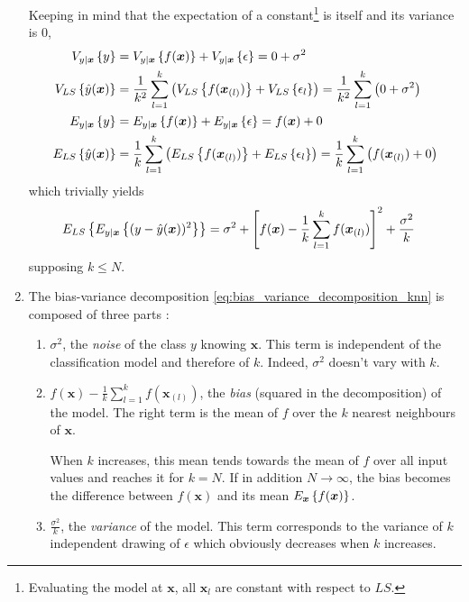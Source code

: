 \documentclass[a4paper, 12pt]{article}
\begin{document}
\begin{enumerate}[label = (\alph*)]
	    Keeping in mind that the expectation of a constant\footnote{Evaluating the model at $\bm{x}$, all $\bm{x}_l$ are constant with respect to $LS$.} is itself and its variance is $0$,
	    \begin{align*}
	        V_{y \mid \bm{x}} \left\{y\right\} & = V_{y \mid \bm{x}} \left\{f(\bm{x})\right\} + V_{y \mid \bm{x}} \left\{\epsilon\right\} = 0 + \sigma^2 \\
	        V_{LS} \left\{\hat{y}(\bm{x})\right\} & = \frac{1}{k^2} \sum_{l = 1}^{k} \left( V_{LS} \left\{f(\bm{x}_{(l)})\right\} + V_{LS} \left\{\epsilon_l\right\}\right) = \frac{1}{k^2} \sum_{l = 1}^{k} \left(0 + \sigma^2\right) \\
	        E_{y \mid \bm{x}} \left\{y\right\} & = E_{y \mid \bm{x}} \left\{f(\bm{x})\right\} + E_{y \mid \bm{x}} \left\{\epsilon\right\} = f(\bm{x}) + 0 \\
	        E_{LS} \left\{\hat{y}(\bm{x})\right\} & = \frac{1}{k} \sum_{l = 1}^{k} \left(E_{LS} \left\{f(\bm{x}_{(l)})\right\} + E_{LS} \left\{\epsilon_l\right\}\right) = \frac{1}{k} \sum_{l = 1}^{k} \left(f(\bm{x}_{(l)}) + 0\right)
	    \end{align*}
	    which trivially yields
	    \begin{align}
	       E_{LS}\left\{E_{y \mid \bm{x}}\left\{(y - \hat{y}(\bm{x}))^2\right\}\right\} & = \sigma^2 + \left[f(\bm{x}) - \frac{1}{k} \sum_{l = 1}^{k} f(\bm{x}_{(l)})\right]^2 + \frac{\sigma^2}{k} \label{eq:bias_variance_decomposition_knn}
	    \end{align}
	    supposing $k \leq N$.
	    \item The bias-variance decomposition \eqref{eq:bias_variance_decomposition_knn} is composed of three parts :
	    \begin{enumerate}[label = \arabic*.]
	        \item $\sigma^2$, the \emph{noise} of the class $y$ knowing $\bm{x}$. This term is independent of the classification model and therefore of $k$. Indeed, $\sigma^2$ doesn't vary with $k$.

	        \item $f(\bm{x}) - \frac{1}{k} \sum_{l = 1}^{k} f(\bm{x}_{(l)})$, the \emph{bias} (squared in the decomposition) of the model. The right term is the mean of $f$ over the $k$ nearest neighbours of $\bm{x}$.
	        
	        When $k$ increases, this mean tends towards the mean of $f$ over all input values and reaches it for $k = N$. If in addition $N \rightarrow \infty$, the bias becomes the difference between $f(\bm{x})$ and its mean $E_{\bm{x}}\left\{f(\bm{x})\right\}$.
	        
	        \item $\frac{\sigma^2}{k}$, the \emph{variance} of the model. This term corresponds to the variance of $k$ independent drawing of $\epsilon$ which obviously decreases when $k$ increases.
	    \end{enumerate}
	\end{enumerate}
	
\end{document}
